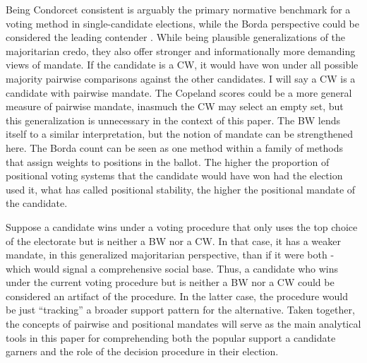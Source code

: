 \documentclass[hidelinks,11pt]{article} \usepackage[utf8]{inputenc}
\begin{document}
Being Condorcet consistent is arguably the primary normative benchmark for a
voting method in single-candidate elections, while the Borda perspective could
be considered the leading contender \parencite{regenwetter2006behavioral,
  felsenthal2011review, nurmi2002voting}. While being plausible generalizations
of the majoritarian credo, they also offer stronger and informationally more
demanding views of mandate. If the candidate is a CW, it would have won under
all possible majority pairwise comparisons against the other candidates. I will
say a CW is a candidate with pairwise mandate. The Copeland scores could be a
more general measure of pairwise mandate, inasmuch the CW may select an empty
set, but this generalization is unnecessary in the context of this paper. The BW
lends itself to a similar interpretation, but the notion of mandate can be
strengthened here. The Borda count can be seen as one method within a family of
methods that assign weights to positions in the ballot. The higher the
proportion of positional voting systems that the candidate would have won had
the election used it, what \textcite{tabarrok2001president} has called
positional stability, the higher the positional mandate of the candidate.

Suppose a candidate wins under a voting procedure that only uses the top choice
of the electorate but is neither a BW nor a CW. In that case, it has a weaker
mandate, in this generalized majoritarian perspective, than if it were both -
which would signal a comprehensive social base. Thus, a candidate who wins under
the current voting procedure but is neither a BW nor a CW could be considered an
artifact of the procedure. In the latter case, the procedure would be just
``tracking'' a broader support pattern for the alternative. Taken together, the
concepts of pairwise and positional mandates will serve as the main analytical
tools in this paper for comprehending both the popular support a candidate
garners and the role of the decision procedure in their election.
\end{document}

